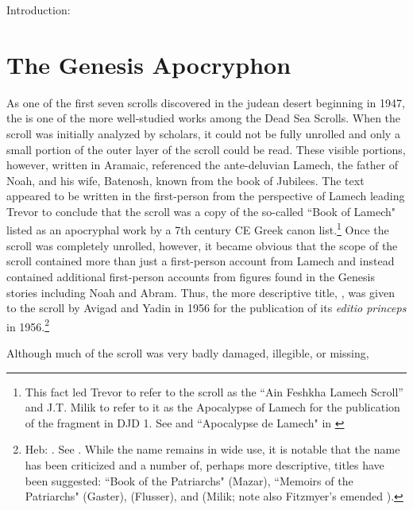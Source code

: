 Introduction:


\section{The Genesis Apocryphon}

As one of the first seven scrolls discovered in the judean desert beginning in 1947, the \ga is one of the more well-studied works among the Dead Sea Scrolls. When the scroll was initially analyzed by scholars, it could not be fully unrolled and only a small portion of the outer layer of the scroll could be read. These visible portions, however, written in Aramaic, referenced the ante-deluvian Lamech, the father of Noah, and his wife, Batenosh, known from the book of Jubilees. The text appeared to be written in the first-person from the perspective of Lamech leading Trevor to conclude that the scroll was a copy of the so-called ``Book of Lamech" listed as an apocryphal work by a 7th century CE Greek canon list.\footnote{This fact led Trevor to refer to the scroll as the ``Ain Feshkha Lamech Scroll'' and J.T. Milik to refer to it as the Apocalypse of Lamech for the publication of the fragment in DJD 1. See \cite[9--10]{trevor_basor1949} and ``Apocalypse de Lamech" in \cite[86--87]{djd_1}} Once the scroll was completely unrolled, however, it became obvious that the scope of the scroll contained more than just a first-person account from Lamech and instead contained additional first-person accounts from figures found in the Genesis stories including Noah and Abram. Thus, the more descriptive title, , was given to the scroll by Avigad and Yadin in 1956 for the publication of its \emph{editio princeps} in 1956.\footnote{Heb: . See \cite{avigad-yadin1956}. While the name \ga remains in wide use, it is notable that the name has been criticized and a number of, perhaps more descriptive, titles have been suggested: ``Book of the Patriarchs" (Mazar), ``Memoirs of the Patriarchs" (Gaster),  (Flusser), and  (Milik; note also Fitzmyer's emended ).}


Although much of the scroll was very badly damaged, illegible, or missing, 




